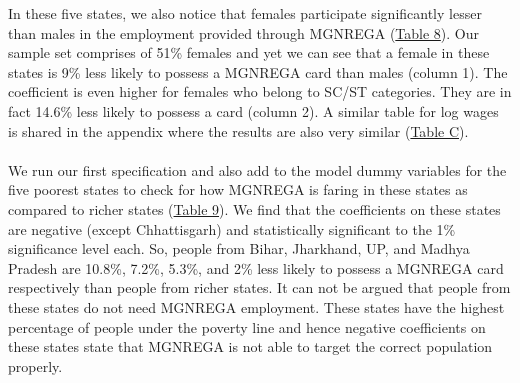 \documentclass{article}
\begin{document}
In these five states, we also notice that females participate significantly lesser than males in the employment provided through MGNREGA (\hyperref[tab8]{Table 8}). Our sample set comprises of 51\% females and yet we can see that a female in these states is 9\% less likely to possess a MGNREGA card than males (column 1). The coefficient is even higher for females who belong to SC/ST categories. They are in fact 14.6\% less likely to possess a card (column 2). A similar table for log wages is shared in the appendix where the results are also very similar (\hyperref[tabC]{Table C}).
\\
\\
We run our first specification and also add to the model dummy variables for the five poorest states to check for how MGNREGA is faring in these states as compared to richer states (\hyperref[tab9]{Table 9}). We find that the coefficients on these states are negative (except Chhattisgarh) and statistically significant to the 1\% significance level each. So, people from Bihar, Jharkhand, UP, and Madhya Pradesh are 10.8\%, 7.2\%, 5.3\%, and 2\%  less likely to possess a MGNREGA card respectively than people from richer states. It can not be argued that people from these states do not need MGNREGA employment. These states have the highest percentage of people under the poverty line and hence negative coefficients on these states state that MGNREGA is not able to target the correct population properly.
\end{document}
